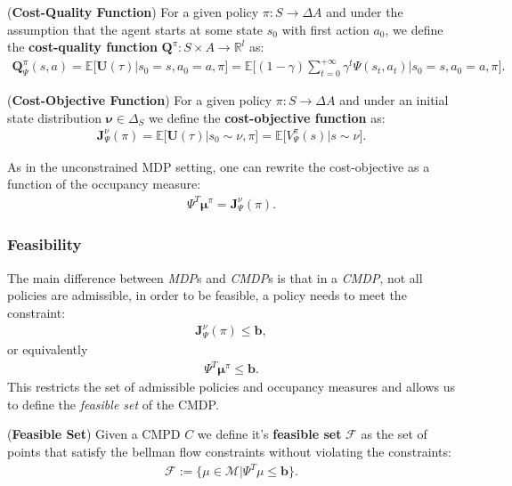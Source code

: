 \begin{definition}
    (\textbf{Cost-Quality Function})
    For a given policy $\pi:S\rightarrow \Delta A$ and under the assumption that the agent starts at some state $s_0$ with first action $a_0$, we define the \textbf{cost-quality function} $\bm{Q}^\pi:S\times A \rightarrow \mathbb{R}^l$ as:
    \begin{align*}
        \bm{Q}_\Psi^\pi(s,a) = \mathbb{E}\Big[ \bm{U}(\tau)  \Big| s_0  = s, a_0  = a, \pi \Big] = \mathbb{E}\Bigg[  (1-\gamma) \sum_{t=0}^{+\infty} \gamma^t  \Psi(s_t,a_t) \Big| s_0  = s, a_0 = a, \pi \Bigg].
    \end{align*}
\end{definition}

\begin{definition}
    (\textbf{Cost-Objective Function})
    For a given policy $\pi:S\rightarrow \Delta A$ and under an initial state distribution $\bm{\nu} \in \Delta_S$ we define the \textbf{cost-objective function} as:
    \begin{align*}
        \bm{J}_\Psi^\nu(\pi) = \mathbb{E}\Big[  \bm{U}(\tau) \Big| s_0 \sim \nu, \pi \Big] =  \mathbb{E}\Big[ V_\Psi^\pi(s) \Big| s \sim \nu\Big].
    \end{align*}
\end{definition}

\begin{observation}
    As in the unconstrained MDP setting, one can rewrite the cost-objective as a function of the occupancy measure:
    \begin{align*}
        \Psi^T \bm{\mu}^\pi = \bm{J}_\Psi^\nu(\pi).
    \end{align*}
\end{observation}

\subsubsection{Feasibility}

The main difference between \textit{MDP}s and \textit{CMDP}s is that in a \textit{CMDP}, not all policies are admissible, in order to be feasible, a policy needs to meet the constraint:
\begin{align*}
    \bm{J}_\Psi^\nu(\pi) \leq \bm{b},
\end{align*}
or equivalently
\begin{align*}
    \Psi^T \bm{\mu}^\pi \leq \bm{b}.
\end{align*}
This restricts the set of admissible policies and occupancy measures and allows us to define the \textit{feasible set} of the CMDP.
\begin{definition}
    (\textbf{Feasible Set}) Given a CMPD $\textit{C}$ we define it's \textbf{feasible set} $\mathcal{F}$ as the set of points that satisfy the bellman flow constraints without violating the constraints:
    \begin{align*}
        \mathcal{F} := \big\{ \mu \in \mathcal{M} \big| \Psi^T\mu\leq \bm{b} \big\}.
    \end{align*}
\end{definition}

